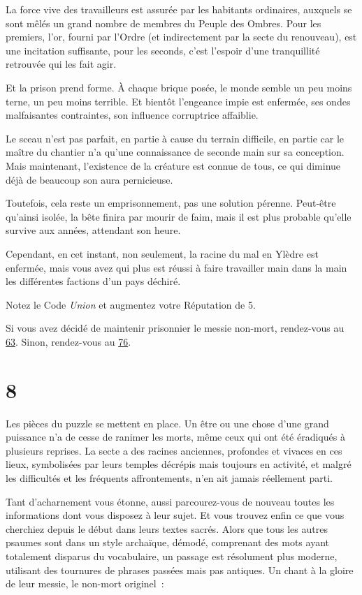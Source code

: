 \documentclass{report}
\newcommand{\gsection}[1]{
    \section{#1}
    \label{section-#1}
}
\newcommand{\glink}[1]{\hyperref[section-#1]{#1}}
\begin{document}
La force vive des travailleurs est assurée par les habitants ordinaires, auxquels se sont mêlés un grand nombre de membres du Peuple des Ombres. Pour les premiers, l'or, fourni par l'Ordre (et indirectement par la secte du renouveau), est une incitation suffisante, pour les seconds, c'est l'espoir d'une tranquillité retrouvée qui les fait agir.

Et la prison prend forme. À chaque brique posée, le monde semble un peu moins terne, un peu moins terrible. Et bientôt l'engeance impie est enfermée, ses ondes malfaisantes contraintes, son influence corruptrice affaiblie.

Le sceau n'est pas parfait, en partie à cause du terrain difficile, en partie car le maître du chantier n'a qu'une connaissance de seconde main sur sa conception. Mais maintenant, l'existence de la créature est connue de tous, ce qui diminue déjà de beaucoup son aura pernicieuse.

Toutefois, cela reste un emprisonnement, pas une solution pérenne. Peut-être qu'ainsi isolée, la bête finira par mourir de faim, mais il est plus probable qu'elle survive aux années, attendant son heure.

Cependant, en cet instant, non seulement, la racine du mal en Ylèdre est enfermée, mais vous avez qui plus est réussi à faire travailler main dans la main les différentes factions d'un pays déchiré.

Notez le Code \emph{Union} et augmentez votre Réputation de 5.

Si vous avez décidé de maintenir prisonnier le messie non-mort, rendez-vous au \glink{63}. Sinon, rendez-vous au \glink{76}.

\gsection{8}

Les pièces du puzzle se mettent en place. Un être ou une chose d'une grand puissance n'a de cesse de ranimer les morts, même ceux qui ont été éradiqués à plusieurs reprises. La secte a des racines anciennes, profondes et vivaces en ces lieux, symbolisées par leurs temples décrépis mais toujours en activité, et malgré les difficultés et les fréquents affrontements, n'en ait jamais réellement parti.

Tant d'acharnement vous étonne, aussi parcourez-vous de nouveau toutes les informations dont vous disposez à leur sujet. Et vous trouvez enfin ce que vous cherchiez depuis le début dans leurs textes sacrés. Alors que tous les autres psaumes sont dans un style archaïque, démodé, comprenant des mots ayant totalement disparus du vocabulaire, un passage est résolument plus moderne, utilisant des tournures de phrases passées mais pas antiques. Un chant à la gloire de leur messie, le non-mort originel :
\end{document}
